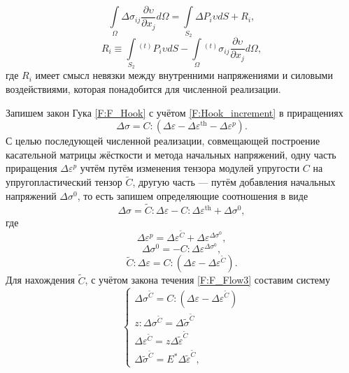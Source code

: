 \begin{equation}
\int\limits_{\Omega}\Delta\sigma_{ij}\frac{\partial\upsilon}{\partial x_j} d\Omega=\int\limits_{S_{2}}\Delta P_{i} \upsilon dS + R_{i},
\label{F:F_var3}
\end{equation}
\begin{equation}
R_{i} \equiv \int\limits_{S_{2}}{}^{(t)}P_{i} \upsilon dS - \int\limits_{\Omega}{}^{(t)}\sigma_{ij}\frac{\partial\upsilon}{\partial x_j} d\Omega,
\label{F:F_var3_add}
\end{equation}
где $R_{i}$ имеет смысл невязки между внутренними напряжениями и силовыми воздействиями, которая понадобится для численной реализации. 

Запишем закон Гука \eqref{F:F_Hook} с учётом \eqref{F:Hook_increment} в приращениях
\begin{equation}
\Delta\sigma=C:\left(\Delta\varepsilon-\Delta\varepsilon^{\mathrm{th}}-\Delta\varepsilon^{p}\right).
\label{F:F_alg_ce1}
\end{equation}
С целью последующей численной реализации, совмещающей построение касательной матрицы жёсткости и метода начальных напряжений, одну часть приращения $\Delta\varepsilon^{p}$ учтём путём изменения тензора модулей упругости $C$ на упругопластический тензор $\tilde{C}$, другую часть --- путём добавления начальных напряжений $\Delta\sigma^{0}$, то есть запишем определяющие соотношения в виде
\begin{equation}
\Delta\sigma=\tilde{C}:\Delta\varepsilon-C:\Delta\varepsilon^{\mathrm{th}}+\Delta\sigma^{0},
\label{F:F_alg_ce_main}
\end{equation}
где
\begin{equation}
\Delta\varepsilon^{p}=\Delta\varepsilon^{\tilde {C}}+\Delta\varepsilon^{\Delta\sigma^{0}},
\label{F:F_alg_ce2}
\end{equation}
\begin{equation}
\Delta\sigma^{0}=-C:\Delta\varepsilon^{\Delta\sigma^{0}},
\label{F:F_alg_ce3}
\end{equation}
\begin{equation}
\tilde{C}:\Delta\varepsilon=C:\left(\Delta\varepsilon-\Delta\varepsilon^{\tilde{C}}\right).
\label{F:F_alg_ce4}
\end{equation}
Для нахождения $\tilde{C}$, с учётом закона течения \eqref{F:F_Flow3} составим систему
\begin{equation}
\begin{cases}
\Delta\sigma^{\tilde{C}}=C:\left(\Delta\varepsilon-\Delta\varepsilon^{\tilde{C}}\right)\\
z:\Delta\sigma^{\tilde{C}}=\Delta\tilde{\sigma}^{\tilde{C}}\\
\Delta\varepsilon^{\tilde{C}}=z \Delta\tilde{\varepsilon}^{\tilde{C}}\\
\Delta\tilde{\sigma}^{\tilde{C}}=E^{*}\Delta\tilde{\varepsilon}^{\tilde{C}},
\end{cases}
\label{F:F_alg_ce_system}
\end{equation}
